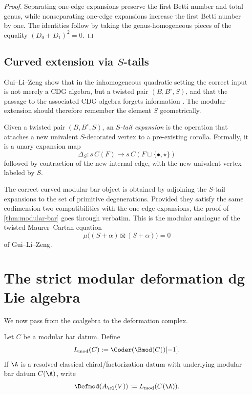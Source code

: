 \begin{proof}
Separating one-edge expansions preserve the first Betti number and total genus, while
nonseparating one-edge expansions increase the first Betti number by one. The identities
follow by taking the genus-homogeneous pieces of the equality $(D_0+D_1)^2=0$.
\end{proof}

\subsection{Curved extension via $S$-tails}

Gui--Li--Zeng show that in the inhomogeneous quadratic setting the correct input is not
merely a CDG algebra, but a twisted pair $(B,B^\circ,S)$, and that the passage to the
associated CDG algebra forgets information \cite{GLZ22}. The modular extension
should therefore remember the element $S$ geometrically.

\begin{definition}
Given a twisted pair $(B,B^\circ,S)$, an \emph{$S$-tail expansion} is the operation that
attaches a new univalent $S$-decorated vertex to a pre-existing corolla. Formally, it is
a unary expansion map
\[
\Delta_S:s\,C(F)\to s\,C(F\sqcup \{\bullet,\star\})
\]
followed by contraction of the new internal edge, with the new univalent vertex labeled by $S$.
\end{definition}

\begin{remark}
The correct curved modular bar object is obtained by adjoining the $S$-tail expansions
to the set of primitive degenerations. Provided they satisfy the same codimension-two
compatibilities with the one-edge expansions, the proof of \cref{thm:modular-bar} goes
through verbatim. This is the modular analogue of the twisted Maurer--Cartan equation
\[
\mu\big((S+\alpha)\boxtimes (S+\alpha)\big)=0
\]
of Gui--Li--Zeng.
\end{remark}

\section{The strict modular deformation dg Lie algebra}

We now pass from the coalgebra to the deformation complex.

\begin{definition}
Let $C$ be a modular bar datum. Define
\[
L_{\mathrm{mod}}(C):=\Coder(\Bmod(C))[-1].
\]
If $\A$ is a resolved classical chiral/factorization datum with underlying modular bar datum
$C(\A)$, write
\[
\Defmod(A_{\cl}(V)):=L_{\mathrm{mod}}(C(\A)).
\]
\end{definition}

